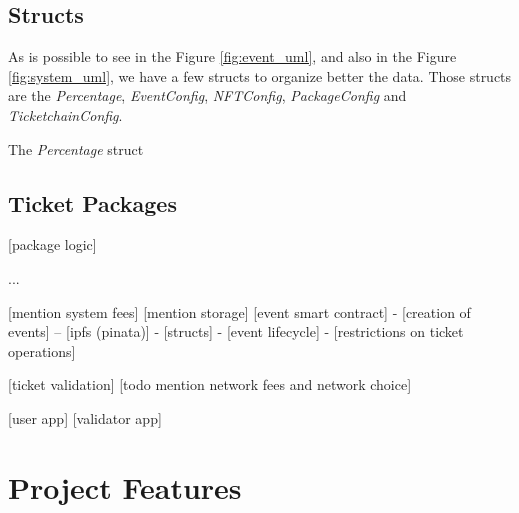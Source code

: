 \subsection{Structs}
\label{subsec:structs}

As is possible to see in the Figure \ref{fig:event_uml}, and also in the Figure \ref{fig:system_uml}, we have a few structs to organize better the data. Those structs are the \textit{Percentage}, \textit{EventConfig}, \textit{NFTConfig}, \textit{PackageConfig} and \textit{TicketchainConfig}.

The \textit{Percentage} struct


\subsection{Ticket Packages}
\label{subsec:ticket_packages}

[package logic]

...


    [mention system fees]
    [mention storage]
    [event smart contract]
- [creation of events]
-- [ipfs (pinata)]
- [structs]
- [event lifecycle]
- [restrictions on ticket operations]

[ticket validation]
[todo mention network fees and network choice]

[user app]
[validator app]

\section{Project Features}
\label{sec:project_features}
